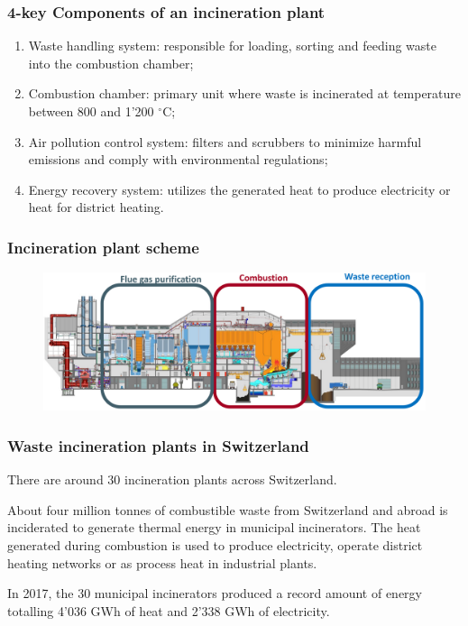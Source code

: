 \documentclass{article}
\newcommand{\cfig}[1]{%
  \begin{figure}[ht!]%
    \centering%
    #1%
  \end{figure}%
}
\begin{document}
\subsubsection{4-key Components of an incineration plant}
\begin{enumerate}
    \item Waste handling system: responsible for loading, sorting and feeding waste into
        the combustion chamber;
    \item Combustion chamber: primary unit where waste is incinerated at temperature
        between 800 and 1'200 $^\circ$C;
    \item Air pollution control system: filters and scrubbers to minimize harmful emissions
        and comply with environmental regulations;
    \item Energy recovery system: utilizes the generated heat to produce electricity or heat
        for district heating.
\end{enumerate}

\subsubsection{Incineration plant scheme}
\phantom{}
\cfig{\includegraphics*[width=.9\textwidth]{media/incineration-plant-scheme.png}}
\phantom{}

\subsubsection{Waste incineration plants in Switzerland}
There are around 30 incineration plants across Switzerland.

About four million tonnes of combustible waste from Switzerland and abroad
is inciderated to generate thermal energy in municipal incinerators.
The heat generated during combustion is used to produce electricity,
operate district heating networks or as process heat in industrial plants.

In 2017, the 30 municipal incinerators produced a record amount of energy
totalling 4'036 GWh of heat and 2'338 GWh of electricity.
\end{document}
